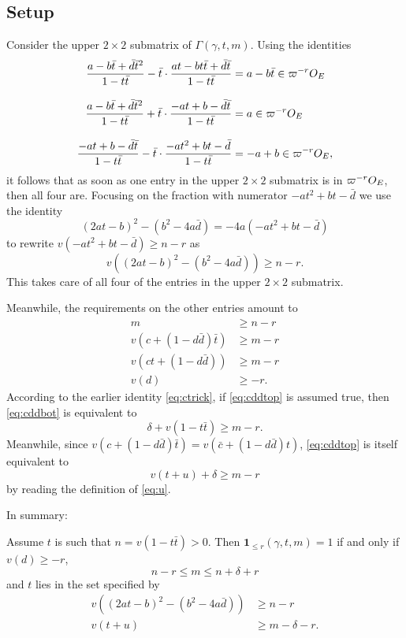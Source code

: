 \subsection{Setup}
Consider the upper $2 \times 2$ submatrix of $\Gamma(\gamma, t, m)$.
Using the identities
\begin{align*}
  \dfrac{a-b\bar t+\bar d \bar t^2}{1-t \bar t}
    - \bar t \cdot \dfrac{at-bt\bar t+\bar d \bar t}{1-t \bar t}
    &= a-b\bar t \in \varpi^{-r} O_E \\[2ex]
  \dfrac{a-b\bar t+\bar d \bar t^2}{1-t \bar t}
    + \bar t \cdot \dfrac{-at+b-\bar d \bar t}{1-t \bar t}
    &= a \in \varpi^{-r} O_E \\[2ex]
  \dfrac{-at+b-\bar d \bar t}{1-t \bar t}
    - \bar t \cdot \dfrac{-at^2+bt-\bar d}{1-t \bar t}
    &= -a+b \in \varpi^{-r} O_E,
\end{align*}
it follows that as soon as one entry in the upper $2 \times 2$
submatrix is in $\varpi^{-r} O_E$, then all four are.
Focusing on the fraction with numerator $-at^2+bt-\bar d$
we use the identity
\[ (2at-b)^2 - (b^2-4a\bar d) = -4a(-at^2+bt-\bar d) \]
to rewrite $v(-at^2+bt-\bar d) \geq n-r$ as
\[ v\left( (2at-b)^2 - (b^2-4a\bar d) \right) \geq n-r. \]
This takes care of all four of the entries in the upper $2 \times 2$ submatrix.

Meanwhile, the requirements on the other entries amount to
\begin{align}
  m & \geq n - r \\
  v\left( c+(1-d \bar d) \bar t \right) &\geq m-r \label{eq:cddtop} \\
  v\left( ct+(1-d \bar d) \right) &\geq m-r \label{eq:cddbot} \\
  v(d) &\ge -r \label{eq:vd_ge_minus_r}.
\end{align}
According to the earlier identity \eqref{eq:ctrick}, if \eqref{eq:cddtop} is assumed true,
then \eqref{eq:cddbot} is equivalent to
\[ \delta + v(1-t \bar t) \ge m-r. \]
Meanwhile, since $v(c+(1-d \bar d) \bar t) = v(\bar c + (1-d \bar d)t)$,
\eqref{eq:cddtop} is itself equivalent to
\[ v(t+u) + \delta \geq m-r \]
by reading the definition of \eqref{eq:u}.

In summary:
\begin{proposition}
  Assume $t$ is such that $n = v(1-t \bar t) > 0$.
  Then $\mathbf{1}_{\le r}(\gamma, t, m) = 1$ if and only if $v(d) \ge -r$,
  \[ n - r \leq m \leq n + \delta + r \]
  and $t$ lies in the set specified by
  \begin{equation}
    \begin{aligned}
      v\left( (2at-b)^2 - (b^2-4a\bar d) \right) &\geq n-r \\
      v(t+u) &\ge m-\delta-r.
    \end{aligned}
    \label{eq:two_disks_S3}
  \end{equation}
\end{proposition}

